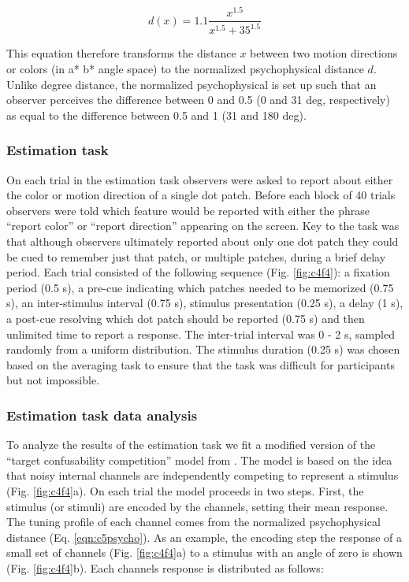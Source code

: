 \begin{equation}
    d(x) = 1.1\frac{x^{1.5}}{x^{1.5}+35^{1.5}}
    \label{eqn:c5psycho}
\end{equation}

This equation therefore transforms the distance $x$ between two motion directions or colors (in a* b* angle space) to the normalized psychophysical distance $d$. Unlike degree distance, the normalized psychophysical is set up such that an observer perceives the difference between 0 and 0.5 (0 and 31 deg, respectively) as equal to the difference between 0.5 and 1 (31 and 180 deg).

\subsubsection{Estimation task}

On each trial in the estimation task observers were asked to report about either the color or motion direction of a single dot patch. Before each block of 40 trials observers were told which feature would be reported with either the phrase ``report color'' or ``report direction'' appearing on the screen. Key to the task was that although observers ultimately reported about only one dot patch they could be cued to remember just that patch, or multiple patches, during a brief delay period. Each trial consisted of the following sequence (Fig. \ref{fig:c4f4}): a fixation period (0.5 s), a pre-cue indicating which patches needed to be memorized (0.75 s), an inter-stimulus interval (0.75 s), stimulus presentation (0.25 s), a delay (1 s), a post-cue resolving which dot patch should be reported (0.75 s) and then unlimited time to report a response. The inter-trial interval was 0 - 2 s, sampled randomly from a uniform distribution. The stimulus duration (0.25 s) was chosen based on the averaging task to ensure that the task was difficult for participants but not impossible. 

\subsubsection{Estimation task data analysis}

To analyze the results of the estimation task we fit a modified version of the ``target confusability competition'' model from \citet{Schurgin2018-vi}. The model is based on the idea that noisy internal channels are independently competing to represent a stimulus (Fig. \ref{fig:c4f4}a). On each trial the model proceeds in two steps. First, the stimulus (or stimuli) are encoded by the channels, setting their mean response. The tuning profile of each channel comes from the normalized psychophysical distance (Eq. \ref{eqn:c5psycho}). As an example, the encoding step the response of a small set of channels (Fig. \ref{fig:c4f4}a) to a stimulus with an angle of zero is shown (Fig. \ref{fig:c4f4}b). Each channels response is distributed as follows:

